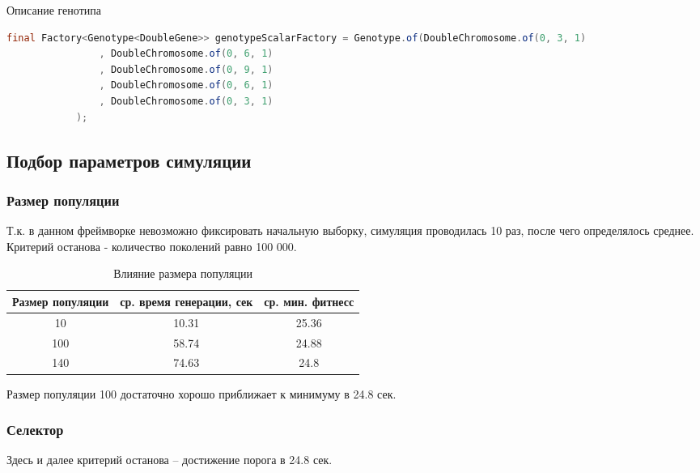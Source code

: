 		\begin{ListingEnv}[H]%
			\caption{Описание генотипа}
			\label{list:hwbeauty}
			\begin{lstlisting}[language={Java}]
			final Factory<Genotype<DoubleGene>> genotypeScalarFactory = Genotype.of(DoubleChromosome.of(0, 3, 1)
				, DoubleChromosome.of(0, 6, 1)
				, DoubleChromosome.of(0, 9, 1)
				, DoubleChromosome.of(0, 6, 1)
				, DoubleChromosome.of(0, 3, 1)
			);
			\end{lstlisting}
		\end{ListingEnv}%
	
	
	\subsection{Подбор параметров симуляции}
		\subsubsection{Размер популяции}
			Т.к. в данном фреймворке невозможно фиксировать начальную выборку, симуляция проводилась 10 раз, после чего определялось среднее. Критерий останова - количество поколений равно 100 000.
			
			\begin{table}[h]
				\centering
				\caption{Влияние размера популяции}
				\label{my-label}
				\begin{tabular}{|c|c|c|}
					\hline
					Размер популяции & ср. время генерации, сек & ср. мин. фитнесс \\ \hline
					10 & 10.31 & 25.36 \\ \hline
					100 & 58.74 & 24.88 \\ \hline
					140 & 74.63 & 24.8 \\ \hline
				\end{tabular}
			\end{table}
		
			Размер популяции 100 достаточно хорошо приближает к минимуму в 24.8 сек.
			\FloatBarrier
		\subsubsection{Селектор}
			Здесь и далее критерий останова -- достижение порога в 24.8 сек.
			
